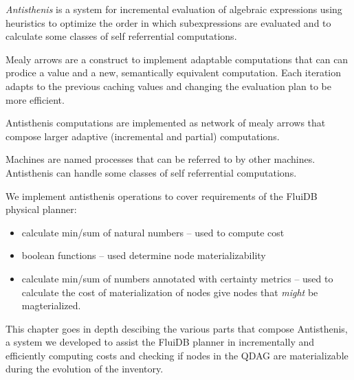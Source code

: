 

\begin{summary}
\item \emph{Antisthenis} is a system for incremental evaluation of
  algebraic expressions using heuristics to optimize the order in
  which subexpressions are evaluated and to calculate some classes of
  self referrential computations.
\item Mealy arrows are a construct to implement adaptable computations
  that can can prodice a value and a new, semantically equivalent
  computation. Each iteration adapts to the previous caching values
  and changing the evaluation plan to be more efficient.
\item Antisthenis computations are implemented as network of mealy
  arrows that compose larger adaptive (incremental and partial)
  computations.
\item Machines are named processes that can be referred to by other
  machines. Antisthenis can handle some classes of self referrential
  computations.
\item We implement antisthenis operations to cover requirements of the
  FluiDB physical planner:

  \begin{itemize}
  \item calculate min/sum of natural numbers -- used to compute cost
  \item boolean functions -- used determine node materializability
  \item calculate min/sum of numbers annotated with certainty metrics
    -- used to calculate the cost of materialization of nodes give
    nodes that \emph{might} be magterialized.
  \end{itemize}
\end{summary}

This chapter goes in depth descibing the various parts that compose
Antisthenis, a system we developed to assist the FluiDB planner in
incrementally and efficiently computing costs and checking if nodes in
the QDAG are materializable during the evolution of the inventory.

